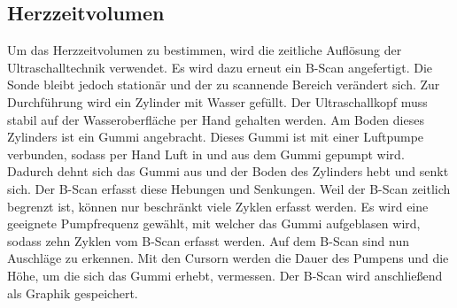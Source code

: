\subsection{Herzzeitvolumen}

Um das Herzzeitvolumen zu bestimmen, wird die zeitliche Auflösung der Ultraschalltechnik verwendet. 
Es wird dazu erneut ein B-Scan angefertigt. Die Sonde bleibt jedoch stationär und der zu scannende 
Bereich verändert sich. Zur Durchführung wird ein Zylinder mit Wasser gefüllt. Der Ultraschallkopf 
muss stabil auf der Wasseroberfläche per Hand gehalten werden. Am Boden dieses 
Zylinders ist ein Gummi angebracht. Dieses Gummi ist mit einer Luftpumpe verbunden, sodass per Hand 
Luft in und aus dem Gummi gepumpt wird. Dadurch dehnt sich das Gummi aus und der Boden des Zylinders 
hebt und senkt sich. Der B-Scan erfasst diese Hebungen und Senkungen. Weil der B-Scan zeitlich 
begrenzt ist, können nur beschränkt viele Zyklen erfasst werden. Es wird eine geeignete Pumpfrequenz 
gewählt, mit welcher das Gummi aufgeblasen wird, sodass zehn Zyklen vom B-Scan erfasst werden. Auf 
dem B-Scan sind nun Auschläge zu erkennen. Mit den Cursorn werden die Dauer des Pumpens und die Höhe, um 
die sich das Gummi erhebt, vermessen. Der B-Scan wird anschließend als Graphik gespeichert.




%

